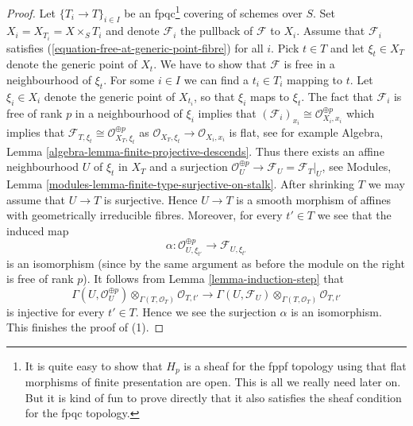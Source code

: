 \documentclass[10pt,a4paper]{amsart}
\theoremstyle{plain}
\theoremstyle{definition}
\theoremstyle{remark}
\numberwithin{equation}{subsection}
\begin{document}
\begin{proof}
Let $\{T_i \to T\}_{i \in I}$ be an fpqc\footnote{It is quite easy to
show that $H_p$
is a sheaf for the fppf topology using that flat morphisms of finite
presentation are open. This is all we really need later on. But it is kind
of fun to prove directly that it also satisfies the sheaf condition
for the fpqc topology.} covering of schemes over $S$.
Set $X_i = X_{T_i} = X \times_S T_i$ and denote $\mathcal{F}_i$ the
pullback of $\mathcal{F}$ to $X_i$. Assume that $\mathcal{F}_i$ satisfies
(\ref{equation-free-at-generic-point-fibre}) for all $i$.
Pick $t \in T$ and let $\xi_t \in X_T$ denote the generic point of $X_t$.
We have to show that $\mathcal{F}$ is free in a neighbourhood of $\xi_t$.
For some $i \in I$ we can find a $t_i \in T_i$ mapping to $t$.
Let $\xi_i \in X_i$ denote the generic point of $X_{t_i}$, so that
$\xi_i$ maps to $\xi_t$. The fact that $\mathcal{F}_i$ is free of rank
$p$ in a neighbourhood of $\xi_i$ implies that
$(\mathcal{F}_i)_{x_i} \cong \mathcal{O}_{X_i, x_i}^{\oplus p}$
which implies that
$\mathcal{F}_{T, \xi_t} \cong \mathcal{O}_{X_T, \xi_t}^{\oplus p}$
as $\mathcal{O}_{X_T, \xi_t} \to \mathcal{O}_{X_i, x_i}$ is flat, see
for example
Algebra, Lemma \ref{algebra-lemma-finite-projective-descends}.
Thus there exists an affine neighbourhood $U$ of $\xi_t$ in $X_T$
and a surjection
$\mathcal{O}_U^{\oplus p} \to \mathcal{F}_U = \mathcal{F}_T|_U$, see
Modules, Lemma \ref{modules-lemma-finite-type-surjective-on-stalk}.
After shrinking $T$ we may assume that $U \to T$ is surjective. Hence
$U \to T$ is a smooth morphism of affines with geometrically irreducible
fibres. Moreover, for every $t' \in T$ we see that the induced map
$$
\alpha :
\mathcal{O}_{U, \xi_{t'}}^{\oplus p}
\longrightarrow
\mathcal{F}_{U, \xi_{t'}}
$$
is an isomorphism (since by the same argument as before the module on the right
is free of rank $p$). It follows from
Lemma \ref{lemma-induction-step}
that
$$
\Gamma(U, \mathcal{O}_U^{\oplus p})
\otimes_{\Gamma(T, \mathcal{O}_T)} \mathcal{O}_{T, t'}
\longrightarrow
\Gamma(U, \mathcal{F}_U)
\otimes_{\Gamma(T, \mathcal{O}_T)} \mathcal{O}_{T, t'}
$$
is injective for every $t' \in T$. Hence we see the surjection $\alpha$ is an
isomorphism. This finishes the proof of (1).


\end{proof}
\end{document}
